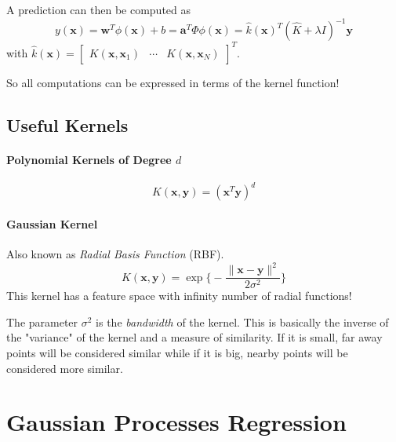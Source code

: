 \documentclass[a4paper, 11pt, accentcolor = tud3b]{tudreport}
\renewcommand{\vec}[1]{\mathbf{#1}}
\begin{document}
				A prediction can then be computed as
				\begin{equation}
					y(\vec{x}) = \vec{w}^T \phi(\vec{x}) + b = \vec{a}^T \Phi \phi(\vec{x}) = \hat{k}(\vec{x})^T (\hat{K} + \lambda I)^{-1} \vec{y}
				\end{equation}
				with \( \hat{k}(\vec{x}) = \begin{bmatrix} K(\vec{x}, \vec{x}_1) & \cdots & K(\vec{x}, \vec{x}_N) \end{bmatrix}^T \).
				
				So all computations can be expressed in terms of the kernel function!

			\subsection{Useful Kernels}
				\paragraph{Polynomial Kernels of Degree \(d\)}
					\begin{equation}
						K(\vec{x}, \vec{y}) = (\vec{x}^T \vec{y})^d
					\end{equation}
				
				\paragraph{Gaussian Kernel}
					Also known as \emph{Radial Basis Function} (RBF).
					\begin{equation}
						K(\vec{x}, \vec{y}) = \exp \Bigg\{ -\frac{\lVert \vec{x} - \vec{y} \rVert^2}{2\sigma^2} \Bigg\}
					\end{equation}
					This kernel has a feature space with infinity number of radial functions!
					
					The parameter \( \sigma^2 \) is the \emph{bandwidth} of the kernel. This is basically the inverse of the "variance" of the kernel and a measure of similarity. If it is small, far away points will be considered similar while if it is big, nearby points will be considered more similar.

		\section{Gaussian Processes Regression}
			\label{sec:gaussianProcesses}
		
\end{document}
